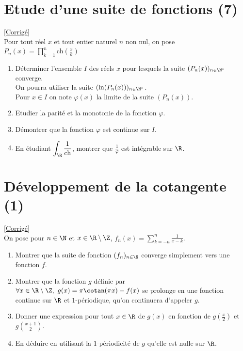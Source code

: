 \documentclass{book}
\begin{document}
	\section{Etude d'une suite de fonctions (7)}
	\textcolor{blue}{\hyperref[sec:etude-dune-suite-de-fonction-7]{[Corrigé]}}\\
	\label{Etude d'une suite de fonctions 7}
	Pour tout réel $x$ et tout entier naturel $n$ non nul, on pose $P_n(x)=\displaystyle\prod\limits_{k=1}^{n} \text{ch}\left( \frac{x}{k}\right)$
	\begin{enumerate}[leftmargin=*]
		\item Déterminer l'ensemble $I$ des réels $x$ pour lesquels la suite $(P_n(x))_{n\in \N^*}$ converge.\\ On pourra utiliser la suite $(\ln(P_n(x)))_{n\in \N^*}$.
		\\ Pour $x\in I$ on note $\varphi(x)$ la limite de la suite $(P_n(x))$.
		\item Etudier la parité et la monotonie de la fonction $\varphi$.
		\item Démontrer que la fonction $\varphi$ est continue sur $I$.
		\item En étudiant $\displaystyle\int_{\R} \frac{1}{\text{ch}}$, montrer que $\displaystyle\frac{1}{\varphi}$ est intégrable sur $\R$.
	\end{enumerate}
	
	\section{Développement de la cotangente (1)}
	\textcolor{blue}{\hyperref[sec:developpement-de-la-cotangente-(1)]{[Corrigé]}}\\
	\label{Développement de la cotangente (1)}
	On pose pour $n\in \N$ et $x\in \R\setminus\Z$, $f_n(x)=\displaystyle\sum_{k=-n}^n\frac{1}{x-k}$.
	\begin{enumerate}
		\item Montrer que la suite de fonction $(f_n)_{n\in \N}$ converge simplement vers une fonction $f$.
		\item Montrer que la fonction $g$ définie par $\forall x\in \R\setminus\Z,\ g(x)=\pi\cotan(\pi x)-f(x)$ se prolonge en une fonction continue sur $\R$ et $1$-périodique, qu'on continuera d'appeler $g$.
		\item Donner une expression pour tout $x\in \R$ de $g(x)$ en fonction de $\displaystyle g\left(\frac{x}{2}\right)$ et $\displaystyle g\left(\frac{x+1}{2}\right)$.
		\item En déduire en utilisant la $1$-périodicité de $g$ qu'elle est nulle sur $\R$.
	\end{enumerate}
	
\end{document}
